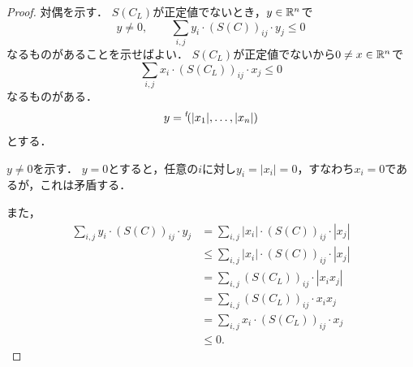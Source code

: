 \begin{proof}
  対偶を示す．
  $S(C_L)$が正定値でないとき，$y \in \mathbb{R}^n$で
  \begin{equation}
    y \ne 0, \qquad \sum_{i, j} y_i \cdot (S(C))_{ij} \cdot y_j \le 0
  \end{equation}
  なるものがあることを示せばよい．
  $S(C_L)$が正定値でないから$0 \ne x \in \mathbb{R}^n$で
  \begin{equation}
    \sum_{i, j} x_i \cdot (S(C_L))_{ij} \cdot x_j \le 0
  \end{equation}
  なるものがある．
  \begin{equation}
    y = {}^t\!(|x_1|, \ldots, |x_n|)
  \end{equation}
  とする．

  $y \ne 0$を示す．
  $y = 0$とすると，任意の$i$に対し$y_i = |x_i| = 0$，すなわち$x_i = 0$であるが，これは矛盾する．

  また，
  \begin{align}
    \sum_{i, j} y_i \cdot (S(C))_{ij} \cdot y_j
    &= \sum_{i, j} |x_i| \cdot (S(C))_{ij} \cdot |x_j| \\
    &\le \sum_{i, j} |x_i| \cdot (S(C))_{ij} \cdot |x_j| \\
    &= \sum_{i, j} (S(C_L))_{ij} \cdot |x_i x_j| \\
    &= \sum_{i, j} (S(C_L))_{ij} \cdot x_i x_j \\
    &= \sum_{i, j} x_i \cdot (S(C_L))_{ij} \cdot x_j \\
    &\le 0.
  \end{align}
\end{proof}